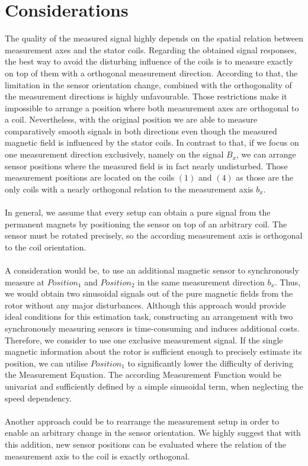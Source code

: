 \documentclass[english]{isasthesis}
\begin{document}
    		\section{Considerations}
    		 The quality of the measured signal highly depends on the spatial relation between measurement axes and the stator coils. Regarding the obtained signal responses, the best way to avoid the disturbing influence of the coils is to measure exactly on top of them with a orthogonal measurement direction. According to that, the limitation in the sensor orientation change, combined with the orthogonality of the measurement directions is highly unfavourable. Those restrictions make it impossible to arrange a position where both measurement axes are orthogonal to a coil. Nevertheless, with the original position we are able to measure comparatively smooth signals in both directions even though the measured magnetic field is influenced by the stator coils. In contrast to that, if we focus on one measurement direction exclusively, namely on the signal $B_x$, we can arrange sensor positions where the measured field is in fact nearly undisturbed. Those measurement positions are located on the coils $(1)$ and $(4)$ as those are the only coils with a nearly orthogonal relation to the measurement axis $b_x$. \\\\
    		 In general, we assume that every setup can obtain a pure signal from the permanent magnets by positioning the sensor on top of an arbitrary coil. The sensor must be rotated precisely, so the according measurement axis is orthogonal to the coil orientation.\\\\    		 
    		A consideration would be, to use an additional magnetic sensor to synchronously measure at $Position_1$ and $Position_2$ in the same measurement direction $b_x$. Thus, we would obtain two sinusoidal signals out of the pure magnetic fields from the rotor without any major disturbances. Although this approach would provide ideal conditions for this estimation task, constructing an arrangement with two synchronously measuring sensors is time-consuming and induces additional costs. Therefore, we consider to use one exclusive measurement signal. If the single magnetic information about the rotor is sufficient enough to precisely estimate its position, we can utilise $Position_1$ to significantly lower the difficulty of deriving the Measurement Equation. The according Measurement Function would be univariat and sufficiently defined by a simple sinusoidal term, when neglecting the speed dependency.  \\\\
    		Another approach could be to rearrange the measurement setup in order to enable an arbitrary change in the sensor orientation. We highly suggest that with this addition, new sensor positions can be evaluated where the relation of the measurement axis to the coil is exactly orthogonal.
   
\end{document}

